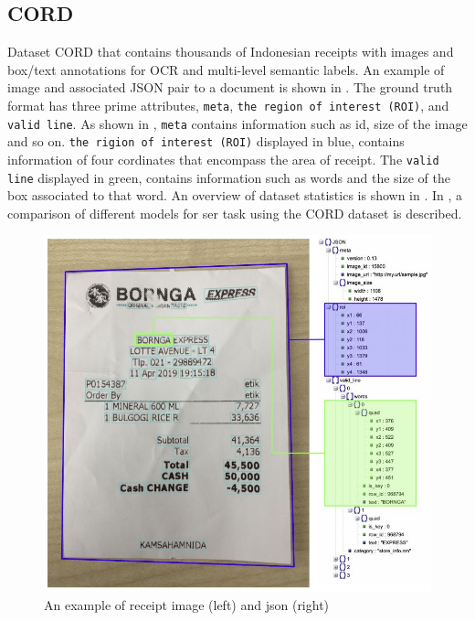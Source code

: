 \subsection{CORD}
Dataset CORD \cite{park2019cord} that contains thousands of Indonesian receipts with images and box/text annotations for OCR and multi-level semantic labels. An example of image and associated JSON pair to a document is shown in . The ground truth format has three prime attributes, \verb|meta|, \verb|the region of interest (ROI)|, and \verb|valid line|. As shown in , \verb|meta| contains information such as id, size of the image and so on. \verb|the rigion of interest (ROI)| displayed in blue, contains information of four cordinates that encompass the area of receipt. The \verb|valid line| displayed in green, contains information such as words and the size of the box associated to that word. An overview of dataset statistics is shown in . In , a comparison of different models for \acrshort{ser} task using the CORD dataset is described.

\begin{figure}[!ht]
    \centering
    \includegraphics[width=0.6 \textwidth]{chapters/images/Methods/Datasets/CORD.JPG}
    \caption{ An example of receipt image (left) and json (right) \cite{park2019cord}}
    \label{fig:CORD_example_image}
\end{figure}

